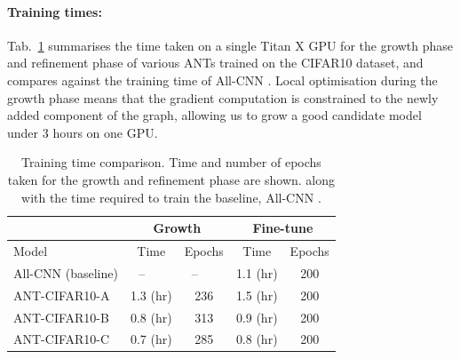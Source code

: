 \paragraph{Training times:}\label{sec:supp_traintime}
Tab.~\ref{table:traintime} summarises the time taken on a single Titan X GPU for the growth phase and refinement phase of various ANTs trained on the CIFAR10 dataset, and compares against the training time of All-CNN \cite{springenberg2014striving}. Local optimisation during the growth phase means that the gradient computation is constrained to the newly added component of the graph, allowing us to grow a good candidate model under $3$ hours on one GPU. 
\begin{table}[ht]
	\footnotesize
	\caption{Training time comparison. Time and number of epochs taken for the growth and refinement phase are shown. along with the time required to train the baseline, All-CNN \cite{springenberg2014striving}.}
	\label{table:traintime}
	\vspace{-7mm}
	\begin{center}
		\begin{tabular}{l|c|c|c|c}
			\hline
			\multicolumn{1}{c}{} &  \multicolumn{2}{c}{\textbf{Growth}} & \multicolumn{2}{c}{\textbf{Fine-tune}}  \\
			\hline
			Model & Time & Epochs  & Time  & Epochs\\
			\hline
			All-CNN (baseline)&--~~~ & --~~~ & 1.1 (hr) &200 \\
			ANT-CIFAR10-A&1.3 (hr) & 236  & 1.5 (hr) &200 \\
			ANT-CIFAR10-B & 0.8 (hr) & 313 & 0.9 (hr) & 200\\
			ANT-CIFAR10-C&  0.7 (hr) &  285& 0.8 (hr) & 200 \\
			\hline
		\end{tabular}
		
	\end{center}
\end{table}
 

